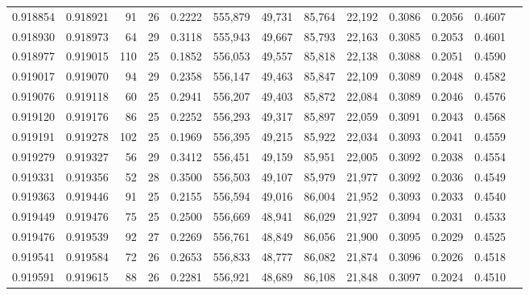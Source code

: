 \begin{tabular}{rrrrrrrrrrrrr}
0.918854 & 0.918921 &    91 &  26 &                                     0.2222 & 555,879 &  49,731 &  85,764 &  22,192 & 0.3086 & 0.2056 & 0.4607 \\
0.918930 & 0.918973 &    64 &  29 &                                     0.3118 & 555,943 &  49,667 &  85,793 &  22,163 & 0.3085 & 0.2053 & 0.4601 \\
0.918977 & 0.919015 &   110 &  25 &                                     0.1852 & 556,053 &  49,557 &  85,818 &  22,138 & 0.3088 & 0.2051 & 0.4590 \\
0.919017 & 0.919070 &    94 &  29 &                                     0.2358 & 556,147 &  49,463 &  85,847 &  22,109 & 0.3089 & 0.2048 & 0.4582 \\
0.919076 & 0.919118 &    60 &  25 &                                     0.2941 & 556,207 &  49,403 &  85,872 &  22,084 & 0.3089 & 0.2046 & 0.4576 \\
0.919120 & 0.919176 &    86 &  25 &                                     0.2252 & 556,293 &  49,317 &  85,897 &  22,059 & 0.3091 & 0.2043 & 0.4568 \\
0.919191 & 0.919278 &   102 &  25 &                                     0.1969 & 556,395 &  49,215 &  85,922 &  22,034 & 0.3093 & 0.2041 & 0.4559 \\
0.919279 & 0.919327 &    56 &  29 &                                     0.3412 & 556,451 &  49,159 &  85,951 &  22,005 & 0.3092 & 0.2038 & 0.4554 \\
0.919331 & 0.919356 &    52 &  28 &                                     0.3500 & 556,503 &  49,107 &  85,979 &  21,977 & 0.3092 & 0.2036 & 0.4549 \\
0.919363 & 0.919446 &    91 &  25 &                                     0.2155 & 556,594 &  49,016 &  86,004 &  21,952 & 0.3093 & 0.2033 & 0.4540 \\
0.919449 & 0.919476 &    75 &  25 &                                     0.2500 & 556,669 &  48,941 &  86,029 &  21,927 & 0.3094 & 0.2031 & 0.4533 \\
0.919476 & 0.919539 &    92 &  27 &                                     0.2269 & 556,761 &  48,849 &  86,056 &  21,900 & 0.3095 & 0.2029 & 0.4525 \\
0.919541 & 0.919584 &    72 &  26 &                                     0.2653 & 556,833 &  48,777 &  86,082 &  21,874 & 0.3096 & 0.2026 & 0.4518 \\
0.919591 & 0.919615 &    88 &  26 &                                     0.2281 & 556,921 &  48,689 &  86,108 &  21,848 & 0.3097 & 0.2024 & 0.4510 \\

\end{tabular}
